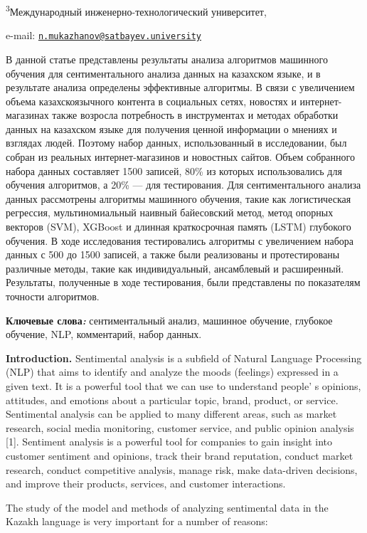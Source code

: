 \textsuperscript{3}Международный инженерно-технологический университет,

e-mail:
\href{mailto:n.mukazhanov@satbayev.university}{\nolinkurl{n.mukazhanov@satbayev.university}}

В данной статье представлены результаты анализа алгоритмов машинного
обучения для сентиментального анализа данных на казахском языке, и в
результате анализа определены эффективные алгоритмы. В связи с
увеличением объема казахскоязычного контента в социальных сетях,
новостях и интернет-магазинах также возросла потребность в инструментах
и методах обработки данных на казахском языке для получения ценной
информации о мнениях и взглядах людей. Поэтому набор данных,
использованный в исследовании, был собран из реальных интернет-магазинов
и новостных сайтов. Объем собранного набора данных составляет 1500
записей, 80\% из которых использовались для обучения алгоритмов, а 20\%
--- для тестирования. Для сентиментального анализа данных рассмотрены
алгоритмы машинного обучения, такие как логистическая регрессия,
мультиномиальный наивный байесовский метод, метод опорных векторов
(SVM), XGBoost и длинная краткосрочная память (LSTM) глубокого обучения.
В ходе исследования тестировались алгоритмы с увеличением набора данных
с 500 до 1500 записей, а также были реализованы и протестированы
различные методы, такие как индивидуальный, ансамблевый и расширенный.
Результаты, полученные в ходе тестирования, были представлены по
показателям точности алгоритмов.

{\bfseries Ключевые слова\emph{:}} сентиментальный анализ, машинное
обучение, глубокое обучение, NLP, комментарий, набор данных.

{\bfseries Introduction.} Sentimental analysis is a subfield of Natural
Language Processing (NLP) that aims to identify and analyze the moods
(feelings) expressed in a given text. It is a powerful tool that we can
use to understand people' s opinions, attitudes, and
emotions about a particular topic, brand, product, or service.
Sentimental analysis can be applied to many different areas, such as
market research, social media monitoring, customer service, and public
opinion analysis {[}1{]}. Sentiment analysis is a powerful tool for
companies to gain insight into customer sentiment and opinions, track
their brand reputation, conduct market research, conduct competitive
analysis, manage risk, make data-driven decisions, and improve their
products, services, and customer interactions.

The study of the model and methods of analyzing sentimental data in the
Kazakh language is very important for a number of reasons:

